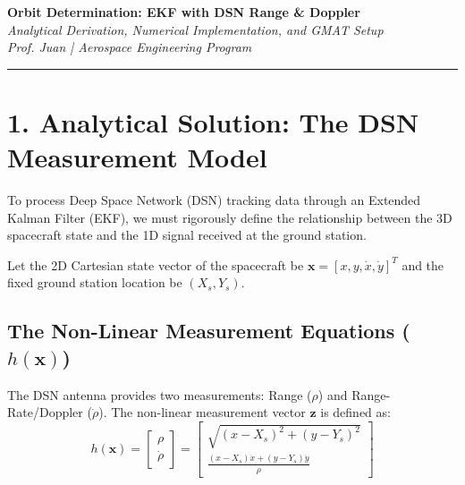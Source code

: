 \documentclass[11pt, letterpaper]{article}
\begin{document}
\begin{center}
    {\Large \textbf{Orbit Determination: EKF with DSN Range \& Doppler}} \\
    \vspace{0.2cm}
    {\large \textit{Analytical Derivation, Numerical Implementation, and GMAT Setup}} \\
    \vspace{0.4cm}
    \textit{Prof. Juan | Aerospace Engineering Program}
\end{center}
\hrule
\vspace{0.5cm}

\section*{1. Analytical Solution: The DSN Measurement Model}

To process Deep Space Network (DSN) tracking data through an Extended Kalman Filter (EKF), we must rigorously define the relationship between the 3D spacecraft state and the 1D signal received at the ground station. 

Let the 2D Cartesian state vector of the spacecraft be $\mathbf{x} = [x, y, \dot{x}, \dot{y}]^T$ and the fixed ground station location be $(X_s, Y_s)$.

\subsection*{The Non-Linear Measurement Equations ($h(\mathbf{x})$)}
The DSN antenna provides two measurements: Range ($\rho$) and Range-Rate/Doppler ($\dot{\rho}$). The non-linear measurement vector $\mathbf{z}$ is defined as:
\begin{equation}
h(\mathbf{x}) = \begin{bmatrix} \rho \\ \dot{\rho} \end{bmatrix} = 
\begin{bmatrix} 
\sqrt{(x - X_s)^2 + (y - Y_s)^2} \\ 
\frac{(x - X_s)\dot{x} + (y - Y_s)\dot{y}}{\rho} 
\end{bmatrix}
\end{equation}
\end{document}
